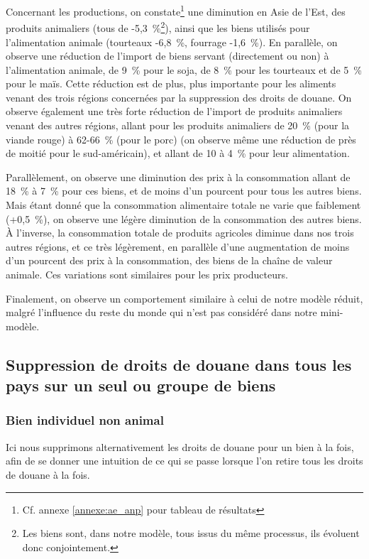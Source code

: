 Concernant les productions, on constate\footnote{Cf. annexe \ref{annexe:ae_anp} pour tableau de résultats} une diminution en Asie de l'Est, des produits animaliers (tous de -5,3~\%\footnote{Les biens sont, dans notre modèle, tous issus du même processus, ils évoluent donc conjointement.}), ainsi que les biens utilisés pour l'alimentation animale (tourteaux -6,8~\%, fourrage -1,6~\%). En parallèle, on observe une réduction de l'import de biens servant (directement ou non) à l'alimentation animale, de 9~\% pour le soja, de 8~\% pour les tourteaux et de 5~\% pour le maïs. Cette réduction est de plus, plus importante pour les aliments venant des trois régions concernées par la suppression des droits de douane. On observe également une très forte réduction de l'import de produits animaliers venant des autres régions, allant pour les produits animaliers de 20~\% (pour la viande rouge) à 62-66~\% (pour le porc) (on observe même une réduction de près de moitié pour le sud-américain), et allant de 10 à 4~\% pour leur alimentation.

Parallèlement, on observe une diminution des prix à la consommation allant de 18~\% à 7~\% pour ces biens, et de moins d'un pourcent pour tous les autres biens. Mais étant donné que la consommation alimentaire totale ne varie que faiblement (+0,5~\%), on observe une légère diminution de la consommation des autres biens. À l'inverse, la consommation totale de produits agricoles diminue dans nos trois autres régions, et ce très légèrement, en parallèle d'une augmentation de moins d'un pourcent des prix à la consommation, des biens de la chaîne de valeur animale. Ces variations sont similaires pour les prix producteurs.

Finalement, on observe un comportement similaire à celui de notre modèle réduit, malgré l'influence du reste du monde qui n'est pas considéré dans notre mini-modèle.


\subsection{Suppression de droits de douane dans tous les pays sur un seul ou groupe de biens}

\subsubsection{Bien individuel non animal}

Ici nous supprimons alternativement les droits de douane pour un bien à la fois, afin de se donner une intuition de ce qui se passe lorsque l'on retire tous les droits de douane à la fois.


